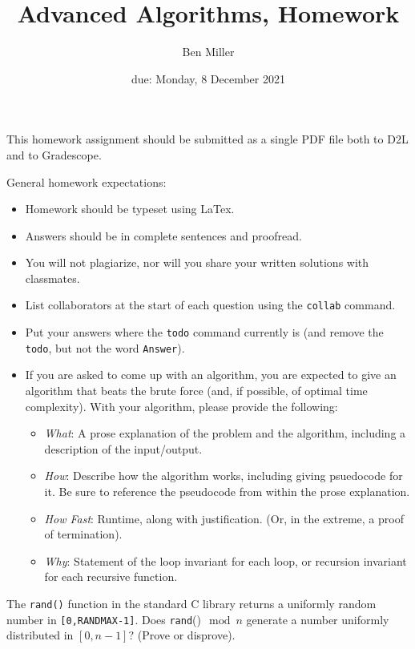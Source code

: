 \documentclass{article}
\title{Advanced Algorithms, Homework \hwnum}
\author{Ben Miller}
\date{due: Monday, 8 December 2021}
\begin{document}
\maketitle

This homework assignment should be
submitted as a single PDF file both to D2L and to Gradescope.

General homework expectations:
\begin{itemize}
    \item Homework should be typeset using LaTex.
    \item Answers should be in complete sentences and proofread.
    \item You will not plagiarize, nor will you share your written solutions
        with classmates.
    \item List collaborators at the start of each question using the
        \texttt{collab} command.
    \item Put your answers where the \texttt{todo} command currently is (and
        remove the \texttt{todo}, but not the word \texttt{Answer}).
    \item If you are asked to come up with an algorithm, you are
        expected to give an algorithm that beats the brute force (and, if possible, of
        optimal time complexity). With your algorithm, please provide the following:
        \begin{itemize}
            \item \emph{What}: A prose explanation of the problem and the algorithm,
                including a description of the input/output.
            \item \emph{How}: Describe how the algorithm works, including giving
                psuedocode for it.  Be sure to reference the pseudocode
                from within the prose explanation.
            \item \emph{How Fast}: Runtime, along with justification.  (Or, in the
                extreme, a proof of termination).
            \item \emph{Why}: Statement of the loop invariant for each loop, or
                recursion invariant for each recursive function.
        \end{itemize}
\end{itemize}


\collab{}
\nextprob{}

The \texttt{rand()} function in the standard C library returns a
uniformly random number in \texttt{[0,RANDMAX-1]}. Does \texttt{rand}()$\mod n$
generate a number uniformly distributed in $[0,n-1]$? (Prove or disprove).
\end{document}
